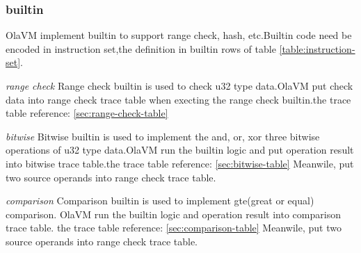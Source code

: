 \subsubsection{builtin}\label{subsec: instructions-builtin}
OlaVM implement builtin to support range check, hash, etc.Builtin code need be encoded in instruction set,the definition in builtin rows of table \ref{table:instruction-set}.

\emph{range check}
Range check builtin is used to check u32 type data.OlaVM put check data into range check trace table when execting the range check builtin.the trace table reference: \ref{sec:range-check-table}

\emph{bitwise}
Bitwise builtin is used to implement the and, or, xor three bitwise operations of u32 type data.OlaVM run the builtin logic and put operation result into bitwise trace table.the trace table reference: \ref{sec:bitwise-table}
Meanwile, put two source operands into range check trace table.

\emph{comparison}
Comparison builtin is used to implement gte(great or equal) comparison. OlaVM run the builtin logic and operation result into comparison trace table. the trace table reference: \ref{sec:comparison-table}
Meanwile, put two source operands into range check trace table.